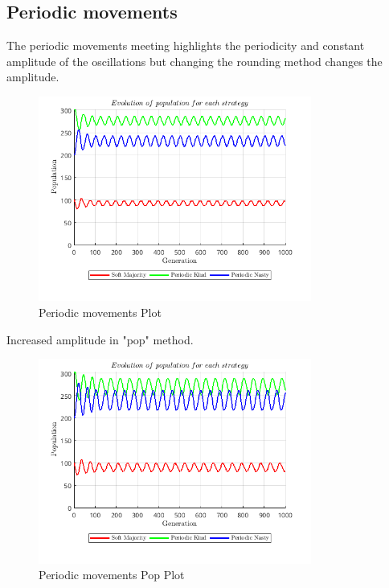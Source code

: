 \subsection{Periodic movements}
The periodic movements meeting highlights the periodicity and constant amplitude of the oscillations but changing the rounding method changes the amplitude.
\begin{figure}[H]
    \centering
    \includegraphics[width=0.8\textwidth]{media/meetings/periodic_movements_dec.png}
    \caption{Periodic movements Plot}
\end{figure}
Increased amplitude in "pop" method.
\begin{figure}[H]
    \centering
    \includegraphics[width=0.8\textwidth]{media/meetings/periodic_movements_pop.png}
    \caption{Periodic movements Pop Plot}
\end{figure}

